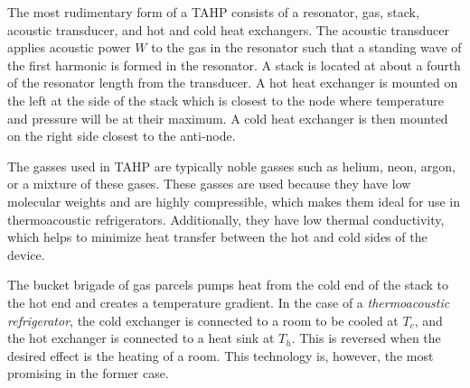 \documentclass[a4paper]{article}
\newcommand{\newpara}
    {
      \bigbreak{}
      \noindent
    }
\begin{document}
\newpara{}
The most rudimentary form of a TAHP consists of a resonator, gas, stack, acoustic transducer, and hot and cold heat exchangers. The acoustic transducer applies acoustic power \(W\) to the gas in the resonator such that a standing wave of the first harmonic is formed in the resonator. A stack is located at about a fourth of the resonator length from the transducer. A hot heat exchanger is mounted on the left at the side of the stack which is closest to the node where temperature and pressure will be at their maximum. A cold heat exchanger is then mounted on the right side closest to the anti-node.
\newpara{}
The gasses used in TAHP are typically noble gasses such as helium, neon, argon, or a mixture of these gases. These gasses are used because they have low molecular weights and are highly compressible, which makes them ideal for use in thermoacoustic refrigerators. Additionally, they have low thermal conductivity, which helps to minimize heat transfer between the hot and cold sides of the device.
\newpara{}
The bucket brigade of gas parcels pumps heat from the cold end of the stack to the hot end and creates a temperature gradient. In the case of a \emph{thermoacoustic refrigerator}, the cold exchanger is connected to a room to be cooled at \(T_c\), and the hot exchanger is connected to a heat sink at \(T_h\). This is reversed when the desired effect is the heating of a room. This technology is, however, the most promising in the former case.
\end{document}
